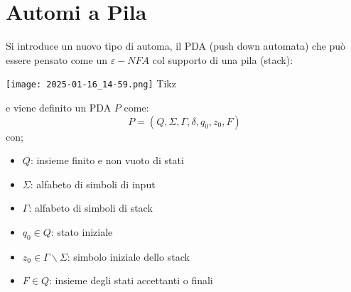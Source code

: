 	\chapter{Automi a Pila}
	Si introduce un nuovo tipo di automa, il PDA (push down automata) che può essere pensato come un $\varepsilon-NFA$ col supporto di una pila (stack):
	\begin{center}
	\texttt{[image: 2025-01-16\_14-59.png]}
	Tikz
	\end{center}
	e viene definito un PDA $P$ come:
	$$P=(Q,\Sigma,\Gamma,\delta,q_0,z_0,F)$$
	con;
	\begin{itemize}
		\item $Q$: insieme finito e non vuoto di stati
		\item $\Sigma$: alfabeto di simboli di input
		\item $\Gamma$: alfabeto di simboli di stack
		\item $q_0\in Q$: stato iniziale
		\item $z_0\in \Gamma\backslash \Sigma$: simbolo iniziale dello stack
		\item $F\in Q$: insieme degli stati accettanti o finali
	\end{itemize}
